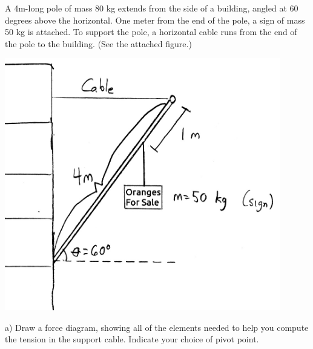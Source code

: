 \documentclass[12pt]{article}
\begin{document}
\begin{minipage}[b]{0.4\textwidth}
  \vspace{-0.8in}

A 4m-long pole of mass 80 kg extends from the side of a building, angled at 60 degrees above the horizontal. One meter from the end of the pole, a sign of mass 50 kg is attached. To support the pole,
a horizontal cable runs from the end of the pole to the building. (See the attached figure.)

\bigskip
\bigskip
\bigskip
\bigskip
\bigskip
\bigskip

\end{minipage}
\begin{minipage}[t]{0.6\textwidth}
  \begin{flushright}
  \includegraphics[width=0.9\textwidth]{sign2.jpg}
\end{flushright}
\end{minipage}

\bigskip
\bigskip

\newpage

a) Draw a force diagram, showing all of the elements needed to help you compute the tension in the support cable. Indicate
your choice of pivot point.

\vspace{5in}

\newpage
\end{document}
